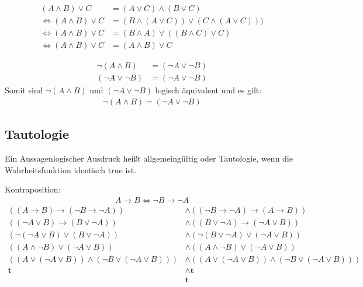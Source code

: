 \documentclass[../ana1u.tex]{subfiles}
\begin{document}
\begin{bsp}
    \begin{align*}
        (A \wedge B) \vee C &= (A \vee C) \wedge (B \vee C)\\
        \Leftrightarrow (A \wedge B) \vee C &= (B \wedge (A \vee C)) \vee (C \wedge (A \vee C)))\\
        \Leftrightarrow (A \wedge B) \vee C &=  (B \wedge A) \vee ((B \wedge C) \vee C)\\
        \Leftrightarrow (A \wedge B) \vee C &= (A \wedge B) \vee C
    \end{align*}		
\end{bsp}
\begin{bsp}
    \begin{align*}
        \neg(A \wedge B) &= (\neg A \vee \neg B)\\
        (\neg A \vee \neg B) &= (\neg A \vee \neg B)
    \end{align*}
    Somit sind \(\neg(A \wedge B)\) und \((\neg A \vee \neg B)\) logisch äquivalent und es gilt:
    \begin{align*}
        \neg(A \wedge B) = (\neg A \vee \neg B)
    \end{align*}
\end{bsp}
\subsection{Tautologie}
\begin{defi}
    Ein Aussagenlogischer Ausdruck heißt allgemeingültig oder Tautologie, wenn die Wahrheitsfunktion identisch true ist.
\end{defi}	
\begin{bsp}
    Kontraposition:\\
    \begin{align*}
        A \rightarrow B \Leftrightarrow \neg B \rightarrow \neg A
    \end{align*}
    \begin{align*}
        ((A \rightarrow B) \rightarrow (\neg B \rightarrow \neg A)) &\wedge ((\neg B \rightarrow \neg A) \rightarrow (A \rightarrow B))\\
        ((\neg A \vee B) \rightarrow (B \vee \neg A)) &\wedge ((B \vee \neg A) \rightarrow (\neg A \vee B))\\
        (\neg (\neg A \vee B) \vee (B \vee \neg A)) &\wedge (\neg (B \vee \neg A) \vee (\neg A \vee B))\\
        ((A \wedge \neg B) \vee (\neg A \vee B)) &\wedge ((A \wedge \neg B) \vee (\neg A \vee B))\\
        ((A \vee (\neg A \vee B)) \wedge (\neg B \vee (\neg A \vee B))) &\wedge ((A \vee (\neg A \vee B)) \wedge (\neg B \vee (\neg A \vee B)))\\
        \textbf{t} &\wedge \textbf{t}\\
        &\textbf{t}
    \end{align*}
\end{bsp}
\end{document}
